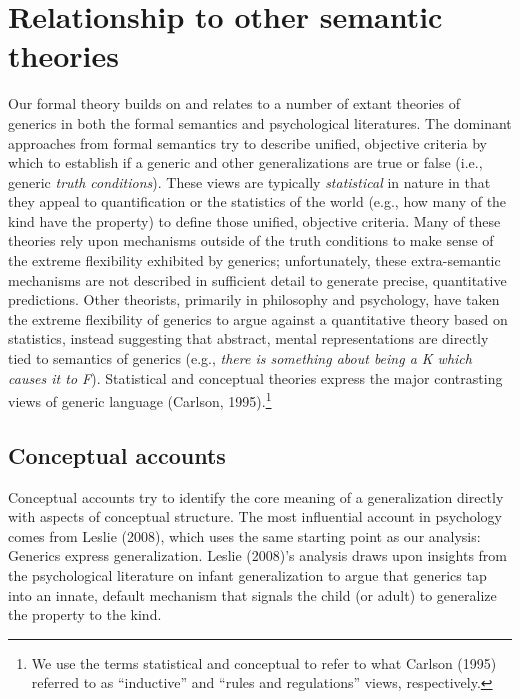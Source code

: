 \documentclass[english,,man,floatsintext]{apa6}
\let\rmarkdownfootnote\footnote%
\def\footnote{\protect\rmarkdownfootnote}
\theoremstyle{definition}
\theoremstyle{definition}
\theoremstyle{definition}
\theoremstyle{remark}
\begin{document}
\hypertarget{relationship-to-other-semantic-theories}{%
\section{Relationship to other semantic
theories}\label{relationship-to-other-semantic-theories}}

Our formal theory builds on and relates to a number of extant theories
of generics in both the formal semantics and psychological literatures.
The dominant approaches from formal semantics try to describe unified,
objective criteria by which to establish if a generic and other
generalizations are true or false (i.e., generic \emph{truth
conditions}). These views are typically \emph{statistical} in nature in
that they appeal to quantification or the statistics of the world (e.g.,
how many of the kind have the property) to define those unified,
objective criteria. Many of these theories rely upon mechanisms outside
of the truth conditions to make sense of the extreme flexibility
exhibited by generics; unfortunately, these extra-semantic mechanisms
are not described in sufficient detail to generate precise, quantitative
predictions. Other theorists, primarily in philosophy and psychology,
have taken the extreme flexibility of generics to argue against a
quantitative theory based on statistics, instead suggesting that
abstract, mental representations are directly tied to semantics of
generics (e.g., \emph{there is something about being a K which causes it
to F}). Statistical and conceptual theories express the major
contrasting views of generic language (Carlson, 1995).\footnote{We use
  the terms statistical and conceptual to refer to what Carlson (1995)
  referred to as \enquote{inductive} and \enquote{rules and regulations}
  views, respectively.}

\hypertarget{conceptual-accounts}{%
\subsection{Conceptual accounts}\label{conceptual-accounts}}

Conceptual accounts try to identify the core meaning of a generalization
directly with aspects of conceptual structure. The most influential
account in psychology comes from Leslie (2008), which uses the same
starting point as our analysis: Generics express generalization. Leslie
(2008)'s analysis draws upon insights from the psychological literature
on infant generalization to argue that generics tap into an innate,
default mechanism that signals the child (or adult) to generalize the
property to the kind.
\end{document}
